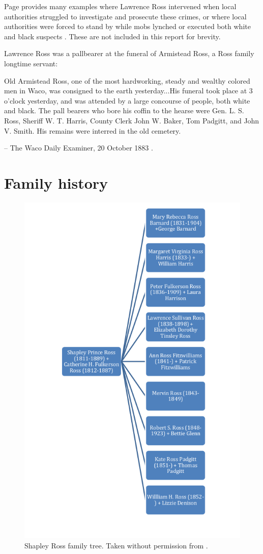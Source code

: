 \documentclass[12pt]{article}
\begin{document}
Page provides many examples where Lawrence Ross intervened when local authorities struggled to investigate and prosecute these crimes, or where local authorities were forced to stand by while mobs lynched or executed both white and black suspects \cite[pg. 95--155, etc]{page}. These are not included in this report for brevity.

Lawrence Ross was a pallbearer at the funeral of Armistead Ross, a Ross family longtime servant:
\begin{displayquote}
Old Armistead Ross, one of the most hardworking, steady and wealthy colored men in Waco, was consigned to the earth yesterday...His funeral took place at 3 o’clock yesterday, and was attended by a large concourse of people, both white and black. The pall bearers who bore his coffin to the hearse were Gen. L. S. Ross, Sheriff W. T. Harris, County Clerk John W. Baker, Tom Padgitt, and John V. Smith. His remains were interred in the old cemetery.

-- The Waco Daily Examiner, 20 October 1883 \cite{wde:1883-10-20}.
\end{displayquote}


\newpage
\section{Family history}

\begin{figure}[h]
\centering
\includegraphics[width=0.6\linewidth]{figures/shapley_ross_family_tree}
\caption{Shapley Ross family tree. Taken without permission from \cite{rosspapersummary}.}
\end{figure}
\end{document}
